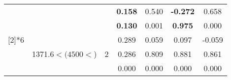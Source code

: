 \begin{table}[htbp]
\begin{tabular}{ccccccc}
          &       &       & \textbf{0.158 } & 0.540  & \textbf{-0.272 } & 0.658  \\
          &       &       & \textbf{0.130 } & 0.001  & \textbf{0.975 } & 0.000  \bigstrut\\\cline{4-7}\noalign{\smallskip}
    \multirow{3}[2]{*}{6} & \multirow{3}[2]{2.5cm}{1371.6$< (4500<$)} & \multirow{3}[2]{*}{2} & 0.289  & 0.059  & 0.097  & -0.059  \\
          &       &       & 0.286  & 0.809  & 0.881  & 0.861  \\
          &       &       & 0.000  & 0.000  & 0.000  & 0.000  \\
    \bottomrule
    \end{tabular}%
  \label{tab:Set3SWJDl}%
\end{table}%
